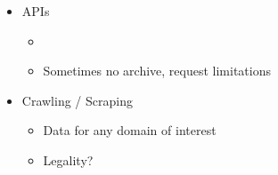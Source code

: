 \begin{frame}
        \begin{itemize}
        \item APIs
        \begin{itemize}
            \item \href{https://developer.twitter.com/en.html}{}\hspace*{6pt}
            \href{https://developer.nytimes.com/}{}\hspace*{8pt}
            \href{http://open-platform.theguardian.com/}{}\hspace*{6pt}
            \item Sometimes no archive, request limitations
        \end{itemize}
        \end{itemize}
        \begin{itemize}
        \item Crawling / Scraping
        \begin{itemize}
            \item Data for any domain of interest
            \item Legality?
        \end{itemize}
    \end{itemize}
\end{frame}


